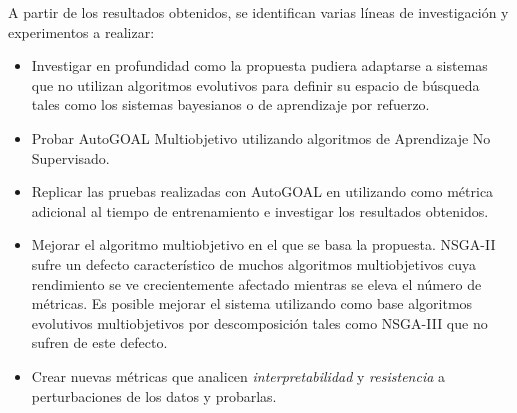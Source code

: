 \begin{recomendations}
A partir de los resultados obtenidos, se identifican varias l\'ineas de investigaci\'on y experimentos a realizar:
\begin{itemize}
    \item Investigar en profundidad  como la propuesta pudiera adaptarse a sistemas que no utilizan algoritmos evolutivos para definir su espacio de b\'usqueda tales como los sistemas bayesianos o de aprendizaje por refuerzo.
    \item Probar AutoGOAL Multiobjetivo utilizando algoritmos de Aprendizaje No Supervisado.
    \item Replicar las pruebas realizadas con AutoGOAL en  utilizando como m\'etrica adicional al tiempo de entrenamiento  e investigar los resultados obtenidos. 
    \item Mejorar el algoritmo multiobjetivo en el que se basa la propuesta. NSGA-II sufre un defecto caracter\'istico de muchos algoritmos multiobjetivos cuya rendimiento se ve crecientemente afectado mientras se eleva el n\'umero de m\'etricas. Es posible mejorar el sistema utilizando como base algoritmos evolutivos multiobjetivos por descomposici\'on tales como NSGA-III  que no sufren de este defecto.
    
    \item Crear nuevas m\'etricas que analicen \textit{interpretabilidad} y \textit{resistencia} a perturbaciones de los datos y probarlas. %
\end{itemize}

\end{recomendations}
